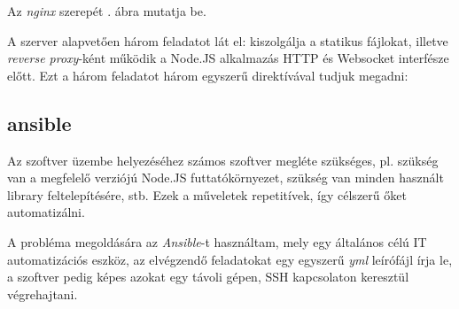 Az \emph{nginx} szerepét . ábra mutatja be.


A szerver alapvetően három feladatot lát el: kiszolgálja a statikus fájlokat, illetve
\emph{reverse proxy}-ként működik a Node.JS alkalmazás HTTP és Websocket
interfésze előtt. Ezt a három feladatot három egyszerű direktívával tudjuk
megadni:


\subsection{ansible}\label{sec:ansible}

Az szoftver üzembe helyezéséhez számos szoftver megléte szükséges, pl. szükség
van a megfelelő verziójú Node.JS futtatókörnyezet, szükség van minden használt
library feltelepítésére, stb. Ezek a műveletek repetitívek, így célszerű őket
automatizálni.

A probléma megoldására az \emph{Ansible}-t\cite{ansible} használtam, mely egy
általános célú IT automatizációs eszköz, az elvégzendő feladatokat egy egyszerű
\emph{yml} leírófájl írja le, a szoftver pedig képes azokat egy távoli gépen,
SSH kapcsolaton keresztül végrehajtani.
